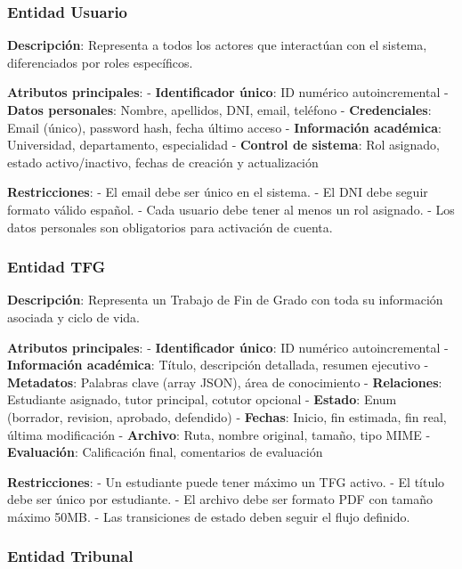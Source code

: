 \documentclass[12pt,a4paper,oneside]{report}
\begin{document}
\subsubsection{Entidad Usuario}\label{entidad-usuario}

\textbf{Descripción}: Representa a todos los actores que interactúan con
el sistema, diferenciados por roles específicos.

\textbf{Atributos principales}: - \textbf{Identificador único}: ID
numérico autoincremental - \textbf{Datos personales}: Nombre, apellidos,
DNI, email, teléfono - \textbf{Credenciales}: Email (único), password
hash, fecha último acceso - \textbf{Información académica}: Universidad,
departamento, especialidad - \textbf{Control de sistema}: Rol asignado,
estado activo/inactivo, fechas de creación y actualización

\textbf{Restricciones}: - El email debe ser único en el sistema. - El
DNI debe seguir formato válido español. - Cada usuario debe tener al
menos un rol asignado. - Los datos personales son obligatorios para
activación de cuenta.

\subsubsection{Entidad TFG}\label{entidad-tfg}

\textbf{Descripción}: Representa un Trabajo de Fin de Grado con toda su
información asociada y ciclo de vida.

\textbf{Atributos principales}: - \textbf{Identificador único}: ID
numérico autoincremental - \textbf{Información académica}: Título,
descripción detallada, resumen ejecutivo - \textbf{Metadatos}: Palabras
clave (array JSON), área de conocimiento - \textbf{Relaciones}:
Estudiante asignado, tutor principal, cotutor opcional -
\textbf{Estado}: Enum (borrador, revision, aprobado, defendido) -
\textbf{Fechas}: Inicio, fin estimada, fin real, última modificación -
\textbf{Archivo}: Ruta, nombre original, tamaño, tipo MIME -
\textbf{Evaluación}: Calificación final, comentarios de evaluación

\textbf{Restricciones}: - Un estudiante puede tener máximo un TFG
activo. - El título debe ser único por estudiante. - El archivo debe ser
formato PDF con tamaño máximo 50MB. - Las transiciones de estado deben
seguir el flujo definido.

\subsubsection{Entidad Tribunal}\label{entidad-tribunal}
\end{document}
